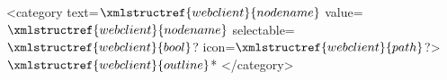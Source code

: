 <category text=$\xmlstructref{webclient}{nodename}$
    value=$\xmlstructref{webclient}{nodename}$ selectable=$\xmlstructref{webclient}{bool}$? 
    icon=$\xmlstructref{webclient}{path}$?>
        $\xmlstructref{webclient}{outline}$*
</category>
